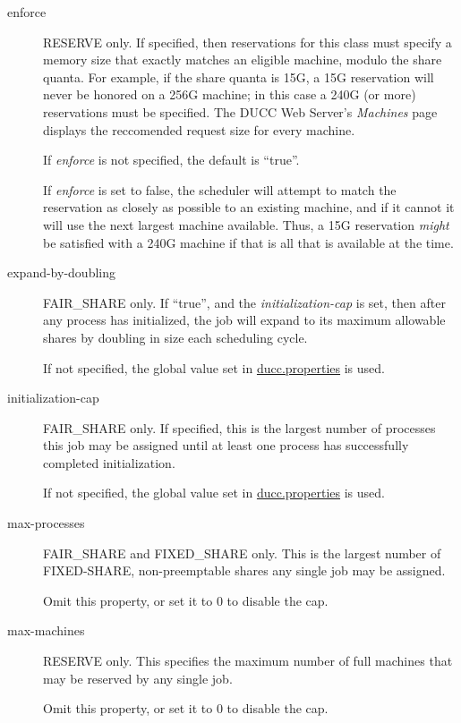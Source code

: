 \begin{description}
      \item[enforce] RESERVE only.  If specified, then reservations for this class must specify a
        memory size that exactly matches an eligible machine, modulo the share quanta.  For example,
        if the share quanta is 15G, a 15G reservation will never be honored on a 256G machine; in this
        case a 240G (or more) reservations must be specified.  The DUCC Web Server's {\em Machines} page
        displays the reccomended request size for every machine.  

        If {\em enforce} is not specified, the default is ``true''.

        If {\em enforce} is set to false, the scheduler will attempt to match the reservation as 
        closely as possible to an existing machine, and if it cannot it will use the next largest
        machine available.  Thus, a 15G reservation {\em might} be satisfied with a 240G machine if
        that is all that is available at the time.

      \item[expand-by-doubling] FAIR\_SHARE only.  If ``true'', and the {\em initialization-cap} is
        set, then after any process has initialized, the job will expand to its maximum allowable
        shares by doubling in size each scheduling cycle.  

        If not specified, the global value set in \hyperref[sec:ducc.properties]{ducc.properties} is used.

      \item[initialization-cap] FAIR\_SHARE only. If specified, this is the largest number of processes this job
        may be assigned until at least one process has successfully completed initialization.

        If not specified, the global value set in \hyperref[sec:ducc.properties]{ducc.properties} is used.

      \item[max-processes] FAIR\_SHARE and FIXED\_SHARE only.  This is the largest number of FIXED-SHARE,
        non-preemptable shares any single job may be assigned.

        Omit this property, or set it to 0 to disable the cap.

      \item[max-machines] RESERVE only.  This specifies the maximum number of full machines that
        may be reserved by any single job.

        Omit this property, or set it to 0 to disable the cap.


\end{description}
